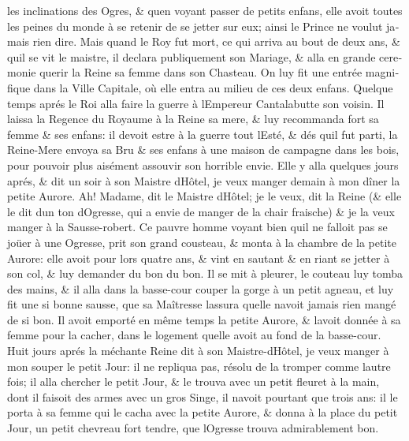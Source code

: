 \documentclass[14pt,a4paper]{memoir}
\begin{document}
\begin{otherlanguage}{french}
les inclinations des Ogres, \& qu\textquotesingle en voyant passer de
petits enfans, elle avoit toutes les peines du monde à se retenir de se
jetter sur eux; ainsi le Prince ne voulut jamais rien dire. Mais quand
le Roy fut mort, ce qui arriva au bout de deux ans, \&
qu\textquotesingle il se vit le maistre, il declara publiquement son
Mariage, \& alla en grande ceremonie querir la Reine sa femme dans son
Chasteau. On luy fit une entrée magnifique dans la Ville Capitale, où
elle entra au milieu de ces deux enfans. Quelque temps aprés le Roi alla
faire la guerre à l\textquotesingle Empereur Cantalabutte son voisin. Il
laissa la Regence du Royaume à la Reine sa mere, \& luy recommanda fort
sa femme \& ses enfans: il devoit estre à la guerre tout
l\textquotesingle Esté, \& dés qu\textquotesingle il fut parti, la
Reine-Mere envoya sa Bru \& ses enfans à une maison de campagne dans les
bois, pour pouvoir plus aisément assouvir son horrible envie. Elle y
alla quelques jours aprés, \& dit un soir à son Maistre
d\textquotesingle Hôtel, je veux manger demain à mon dîner la petite
Aurore. Ah! Madame, dit le Maistre d\textquotesingle Hôtel; je le veux,
dit la Reine (\& elle le dit d\textquotesingle un ton
d\textquotesingle Ogresse, qui a envie de manger de la chair fraische)
\& je la veux manger à la Sausse-robert. Ce pauvre homme voyant bien
qu\textquotesingle il ne falloit pas se joüer à une Ogresse, prit son
grand cousteau, \& monta à la chambre de la petite Aurore: elle avoit
pour lors quatre ans, \& vint en sautant \& en riant se jetter à son
col, \& luy demander du bon du bon. Il se mit à pleurer, le couteau luy
tomba des mains, \& il alla dans la basse-cour couper la gorge à un
petit agneau, et luy fit une si bonne sausse, que sa Maîtresse
l\textquotesingle assura qu\textquotesingle elle n\textquotesingle avoit
jamais rien mangé de si bon. Il avoit emporté en même temps la petite
Aurore, \& l\textquotesingle avoit donnée à sa femme pour la cacher,
dans le logement qu\textquotesingle elle avoit au fond de la basse-cour.
Huit jours aprés la méchante Reine dit à son
Maistre-d\textquotesingle Hôtel, je veux manger à mon souper le petit
Jour: il ne repliqua pas, résolu de la tromper comme
l\textquotesingle autre fois; il alla chercher le petit Jour, \& le
trouva avec un petit fleuret à la main, dont il faisoit des armes avec
un gros Singe, il n\textquotesingle avoit pourtant que trois ans: il le
porta à sa femme qui le cacha avec la petite Aurore, \& donna à la place
du petit Jour, un petit chevreau fort tendre, que
l\textquotesingle Ogresse trouva admirablement bon.


\end{otherlanguage}
\end{document}
